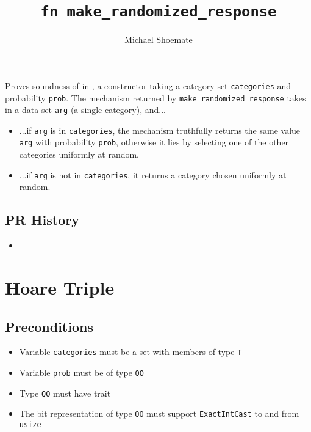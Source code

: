 \documentclass{article}
\title{\texttt{fn make\_randomized\_response}}
\author{Michael Shoemate}
\begin{document}
\maketitle

\contrib

Proves soundness of  in ,
a constructor taking a category set \texttt{categories} and probability \texttt{prob}.
The mechanism returned by \texttt{make\_randomized\_response} takes in a data set \texttt{arg} (a single category), and...

\begin{itemize}
    \item ...if \texttt{arg} is in \texttt{categories},
    the mechanism truthfully returns the same value \texttt{arg} with probability \texttt{prob},
    otherwise it lies by selecting one of the other categories uniformly at random.
    \item ...if \texttt{arg} is not in \texttt{categories}, 
    it returns a category chosen uniformly at random.
\end{itemize}

\subsection*{PR History}
\begin{itemize}
    \item {}
\end{itemize}

\section{Hoare Triple}

\subsection*{Preconditions}
\begin{itemize}
    \item Variable \texttt{categories} must be a set with members of type \texttt{T}
    \item Variable \texttt{prob} must be of type \texttt{QO}
    \item Type \texttt{QO} must have trait 
    \item The bit representation of type \texttt{QO} must support \texttt{ExactIntCast} to and from \texttt{usize}
\end{itemize}
\end{document}
